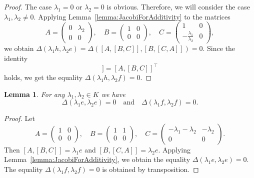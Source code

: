 \documentclass[a4paper,reqno,12pt]{amsart}
\newtheorem{lemma}[proposition]{Lemma}
\theoremstyle{definition}
\theoremstyle{remark}
\begin{document}
	\begin{proof}
		The case $\lambda_1 = 0$ or $\lambda_2 = 0$ is obvious. Therefore, we will consider the case $\lambda_1, \lambda_2 \neq 0$. Applying Lemma~\ref{lemma:JacobiForAdditivity} to the matrices
		\begin{equation*}
			A = 
			\begin{pmatrix}
				0 & \lambda_2 \\
				0 & 0
			\end{pmatrix}, \quad
			B = 
			\begin{pmatrix}
				1 & 0 \\
				0 & 0
			\end{pmatrix}, \quad
			C = 
			\begin{pmatrix}
				1 & 0 \\
				-\frac{\lambda_1}{\lambda_2} & 0
			\end{pmatrix},
		\end{equation*}
		we obtain $\Delta(\lambda_1 h, \lambda_2 e) = \Delta([A, [B, C]], [B, [C, A]]) = 0$. Since the identity
		\begin{equation*}
			[A^{\top}, [B^{\top}, C^{\top}]] = [A, [B, C]]^{\top}
		\end{equation*}
		holds, we get the equality $\Delta(\lambda_1 h, \lambda_2 f) = 0$.
	\end{proof}

	\begin{lemma}\label{lemma:additivityForE}
		For any $\lambda_1, \lambda_2 \in K$ we have
		\begin{equation*}
			\Delta(\lambda_1 e, \lambda_2 e) = 0 \quad \text{and} \quad \Delta(\lambda_1 f, \lambda_2 f) = 0.
		\end{equation*}
	\end{lemma}
	
	\begin{proof}
		Let
		\begin{equation*}
			A = 
			\begin{pmatrix}
				1 & 0 \\
				0 & 0
			\end{pmatrix}, \quad
			B = 
			\begin{pmatrix}
				1 & 1 \\
				0 & 0
			\end{pmatrix}, \quad
			C = 
			\begin{pmatrix}
				-\lambda_1 - \lambda_2 & -\lambda_2 \\
				0 & 0
			\end{pmatrix}.
		\end{equation*}
		Then $[A, [B, C]] = \lambda_1 e$ and $[B, [C, A]] = \lambda_2 e$. Applying Lemma~\ref{lemma:JacobiForAdditivity}, we obtain the equality $\Delta(\lambda_1 e, \lambda_2 e) = 0$. The equality $\Delta(\lambda_1 f, \lambda_2 f) = 0$ is obtained by transposition.
	\end{proof}
\end{document}
